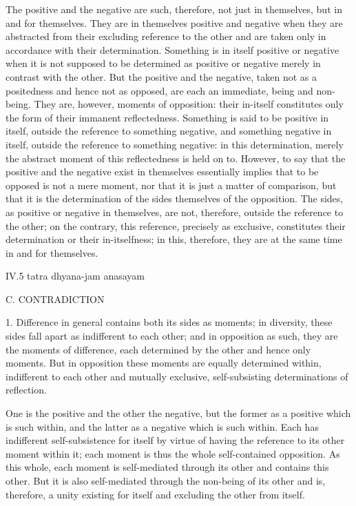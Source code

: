 The positive and the negative are such, therefore,
not just in themselves, but in and for themselves.
They are in themselves positive and negative
when they are abstracted from their excluding
reference to the other
and are taken only in accordance
with their determination.
Something is in itself positive or negative
when it is not supposed to be
determined as positive or negative
merely in contrast with the other.
But the positive and the negative,
taken not as a positedness
and hence not as opposed,
are each an immediate,
being and non-being.
They are, however, moments of opposition:
their in-itself constitutes only
the form of their immanent reflectedness.
Something is said to be positive in itself,
outside the reference to something negative,
and something negative in itself,
outside the reference to something negative:
in this determination, merely the abstract moment of
this reflectedness is held on to.
However, to say that the positive and the negative
exist in themselves essentially implies that
to be opposed is not a mere moment,
nor that it is just a matter of comparison,
but that it is the determination of the sides
themselves of the opposition.
The sides, as positive or negative in themselves,
are not, therefore, outside the reference to the other;
on the contrary, this reference, precisely as exclusive,
constitutes their determination or their in-itselfness;
in this, therefore, they are at the same time
in and for themselves.

IV.5
tatra dhyana-jam anasayam

C. CONTRADICTION

1. Difference in general contains both its sides as moments;
in diversity, these sides fall apart as indifferent to each other;
and in opposition as such, they are the moments of difference,
each determined by the other and hence only moments.
But in opposition these moments are equally determined within,
indifferent to each other and mutually exclusive,
self-subsisting determinations of reflection.

One is the positive and the other the negative,
but the former as a positive which is such within,
and the latter as a negative which is such within.
Each has indifferent self-subsistence for itself
by virtue of having the reference to
its other moment within it;
each moment is thus the whole self-contained opposition.
As this whole, each moment is self-mediated
through its other and contains this other.
But it is also self-mediated
through the non-being of its other
and is, therefore, a unity existing for itself
and excluding the other from itself.

